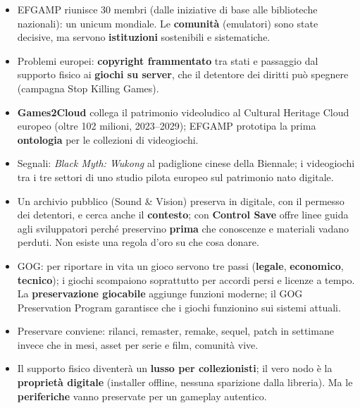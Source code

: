 \begin{itemize}
  \item EFGAMP riunisce 30 membri (dalle iniziative di base alle biblioteche
        nazionali): un unicum mondiale. Le \textbf{comunità} (emulatori) sono
        state decisive, ma servono \textbf{istituzioni} sostenibili e
        sistematiche.
  \item Problemi europei: \textbf{copyright frammentato} tra stati e passaggio
        dal supporto fisico ai \textbf{giochi su server}, che il detentore dei
        diritti può spegnere (campagna Stop Killing Games).
  \item \textbf{Games2Cloud} collega il patrimonio videoludico al Cultural
        Heritage Cloud europeo (oltre 102 milioni, 2023--2029); EFGAMP prototipa
        la prima \textbf{ontologia} per le collezioni di videogiochi.
  \item Segnali: \emph{Black Myth: Wukong} al padiglione cinese della Biennale;
        i videogiochi tra i tre settori di uno studio pilota europeo sul
        patrimonio nato digitale.
  \item Un archivio pubblico (Sound \& Vision) preserva in digitale, con il
        permesso dei detentori, e cerca anche il \textbf{contesto}; con
        \textbf{Control Save} offre linee guida agli sviluppatori perché
        preservino \textbf{prima} che conoscenze e materiali vadano perduti.
        Non esiste una regola d'oro su che cosa donare.
  \item GOG: per riportare in vita un gioco servono tre passi (\textbf{legale},
        \textbf{economico}, \textbf{tecnico}); i giochi scompaiono soprattutto
        per accordi persi e licenze a tempo. La \textbf{preservazione
        giocabile} aggiunge funzioni moderne; il GOG Preservation Program
        garantisce che i giochi funzionino sui sistemi attuali.
  \item Preservare conviene: rilanci, remaster, remake, sequel, patch in
        settimane invece che in mesi, asset per serie e film, comunità vive.
  \item Il supporto fisico diventerà un \textbf{lusso per collezionisti}; il vero
        nodo è la \textbf{proprietà digitale} (installer offline, nessuna
        sparizione dalla libreria). Ma le \textbf{periferiche} vanno preservate
        per un gameplay autentico.
\end{itemize}

